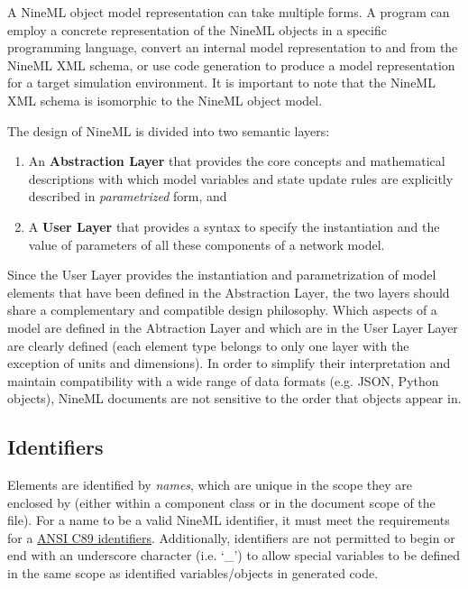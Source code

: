 \documentclass[draftspec]{ninemlspec}
\begin{document}
A NineML object model representation can take multiple forms.  A
program can employ a concrete representation of the NineML objects in
a specific programming language, convert an internal model
representation to and from the NineML XML schema, or use code generation 
to produce a model representation for a target simulation environment. 
It is important to note that the NineML XML schema is isomorphic to the NineML
object model.

The design of NineML is divided into two semantic layers:
\begin {enumerate}
\item An {\bf Abstraction Layer} that provides the core concepts and
mathematical descriptions with which model variables and state update
rules are explicitly described in {\em parametrized} form, and
\item A {\bf User Layer} that provides a syntax to specify the
instantiation and the value of parameters of all these components of a network
model.
\end {enumerate}

Since the User Layer provides the instantiation and
parametrization of model elements that have been defined in the
Abstraction Layer, the two layers should share
a complementary and compatible design philosophy. Which aspects of a model
are defined in the Abtraction Layer and which are in the User Layer
Layer are clearly defined (each element type belongs to only one layer with the exception of units and dimensions).
In order to simplify their interpretation and maintain compatibility with a wide 
range of data formats (e.g. JSON, Python objects), NineML documents are 
not sensitive to the order that objects appear in.

\subsection{Identifiers}
\label{sec:identifier}

Elements are identified by \emph{names}, which are unique in the scope they are enclosed by (either within a component class or in the document scope of the file). For a name to be a valid NineML identifier, it must meet the requirements for a \href{http://msdn.microsoft.com/en-us/library/e7f8y25b.aspx}{ANSI C89 identifiers}. Additionally, identifiers are not permitted to begin or end with an underscore character (i.e. `\_') to allow special variables to be defined in the same scope as identified variables/objects in generated code.
\end{document}
